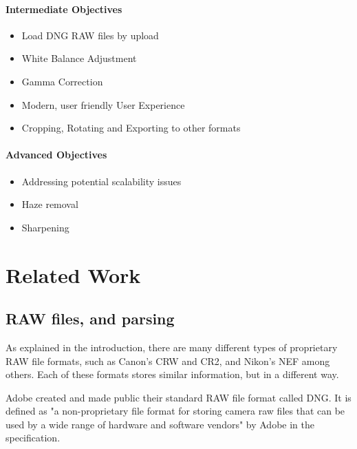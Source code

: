 \documentclass[12pt,a4paper]{article}
\begin{document}
\paragraph{Intermediate Objectives}
    \begin{itemize}
      \item Load DNG RAW files by upload
      \item White Balance Adjustment
      \item Gamma Correction
      \item Modern, user friendly User Experience
      \item Cropping, Rotating and Exporting to other formats
    \end{itemize}
\paragraph{Advanced Objectives}
    \begin{itemize}
      \item Addressing potential scalability issues
      \item Haze removal
      \item Sharpening
    \end{itemize}
\section{Related Work}


\subsection{RAW files, and parsing}
% 

As explained in the introduction, there are many different types of proprietary RAW file formats, such as Canon's CRW and CR2, and Nikon's NEF among others.
Each of these formats stores similar information, but in a different way.

Adobe created and made public their standard RAW file format called DNG. It is defined as "a non-proprietary file format for storing camera raw files that
can be used by a wide range of hardware and software vendors" by Adobe in the specification. \cite{DNGSpec}
\end{document}
